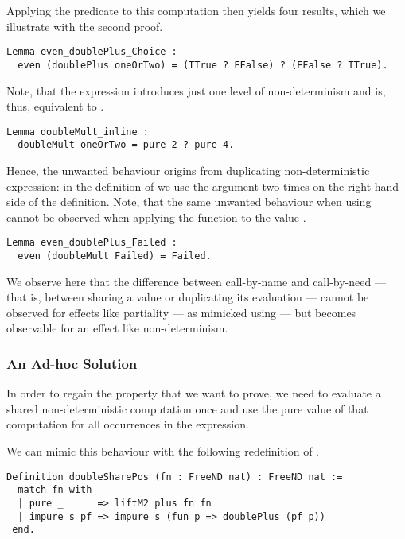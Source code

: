 \noindent Applying the predicate  to this computation then yields four results, which we illustrate with the second proof.

\begin{verbatim}
Lemma even_doublePlus_Choice :
  even (doublePlus oneOrTwo) = (TTrue ? FFalse) ? (FFalse ? TTrue).
\end{verbatim}

Note, that the expression  introduces just one level of non\--determinism and is, thus, equivalent to .

\begin{verbatim}
Lemma doubleMult_inline :
  doubleMult oneOrTwo = pure 2 ? pure 4.
\end{verbatim}

Hence, the unwanted behaviour origins from duplicating non\--deterministic expression: in the definition of  we use the argument  two times on the right\--hand side of the definition.
Note, that the same unwanted behaviour when using  cannot be observed when applying the function to the value .

\begin{verbatim}
Lemma even_doublePlus_Failed :
  even (doubleMult Failed) = Failed.
\end{verbatim}

We observe here that the difference between call\--by\--name and call\--by\--need --- that is, between sharing a value or duplicating its evaluation --- cannot be observed for effects like partiality --- as mimicked using  --- but becomes observable for an effect like non\--determinism.

\subsubsection{An Ad\--hoc Solution}
\label{subsubsec:adhoc}

In order to regain the property that we want to prove, we need to evaluate a shared non\--deterministic computation once and use the pure value of that computation for all occurrences in the expression.

We can mimic this behaviour with the following redefinition of .

\begin{verbatim}
Definition doubleSharePos (fn : FreeND nat) : FreeND nat :=
  match fn with
  | pure _      => liftM2 plus fn fn
  | impure s pf => impure s (fun p => doublePlus (pf p))
 end.
\end{verbatim}

